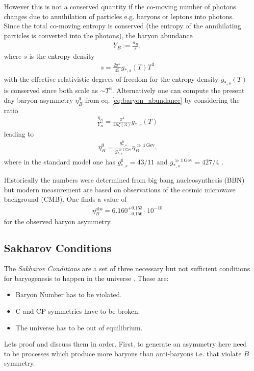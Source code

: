 \documentclass[13pt,a4paper,titlepage]{article}
\begin{document}
However this is not a conserved quantity if the co-moving number of photons changes due to annihilation
of particles e.g. baryons or leptons into photons.
Since the total co-moving entropy is conserved (the entropy of the annihilating particles is converted into the photons), the baryon abundance
\begin{align}
    \label{eq:baryon_abundance}
    Y_B := \frac{n_B}{s},
\end{align}
where $s$ is the entropy density
\begin{align}
    s = \frac{2 \pi^2}{45} g_{*, s}(T) T^3
\end{align}
with the effective relativistic degrees of freedom for the entropy density $g_{*, s}(T)$
is conserved since both scale as $\sim T^3$.
Alternatively one can compute the present day baryon asymmetry $\eta_B^0$ from eq. \eqref{eq:baryon_abundance} by considering the ratio
\begin{align}
    \frac{\eta_B}{Y_B} = \frac{\pi^4}{45 \zeta(3)} g_{*, s}(T)
\end{align}
leading to
\begin{align}
    \label{eq:asymmetry_redshift}
    \eta_B^0 = \frac{g_{*,s}^0}{g_{*, s}^{\gg 1 \, \mathrm{Gev}}} \eta_B^{\gg 1 \, \mathrm{Gev}}.
\end{align}
where in the standard model one has $g_{*,s}^0 = 43/11$ and $g_{*, s}^{\gg 1 \, \mathrm{Gev}} = 427/4$ \cite[sec. 3.4]{the_early_universe_kolb_and_turner}.

\noindent
Historically the numbers were determined from big bang nucleosynthesis (BBN) \cite[sec. III.1]{Matter_and_Antimatter_Canetti_2012} but modern measurement are based on observations of the cosmic microwave background (CMB).
One finds a value of \cite[eq. 7]{Matter_and_Antimatter_Canetti_2012}
\begin{align}
    \label{eq:observed_bau}
    \eta_B^\mathrm{obs} = 6.160^{+ 0.153}_{-0.156} \cdot 10^{-10}
\end{align}
for the observed baryon asymmetry.

\subsection{Sakharov Conditions}
\label{sec:sakharov_conditions}

The \emph{Sakharov Conditions} are a set of three necessary but not sufficient conditions for baryogenesis to happen in the universe \cite{Sakharov_1991}. These are:
\begin{itemize}
    \item Baryon Number has to be violated.
    \item C and CP symmetries have to be broken.
    \item The universe has to be out of equilibrium.
\end{itemize}
Lets proof and discuss them in order.
First, to generate an asymmetry here need to be processes which produce more baryons than anti-baryons i.e. that violate $B$ symmetry.
\end{document}
